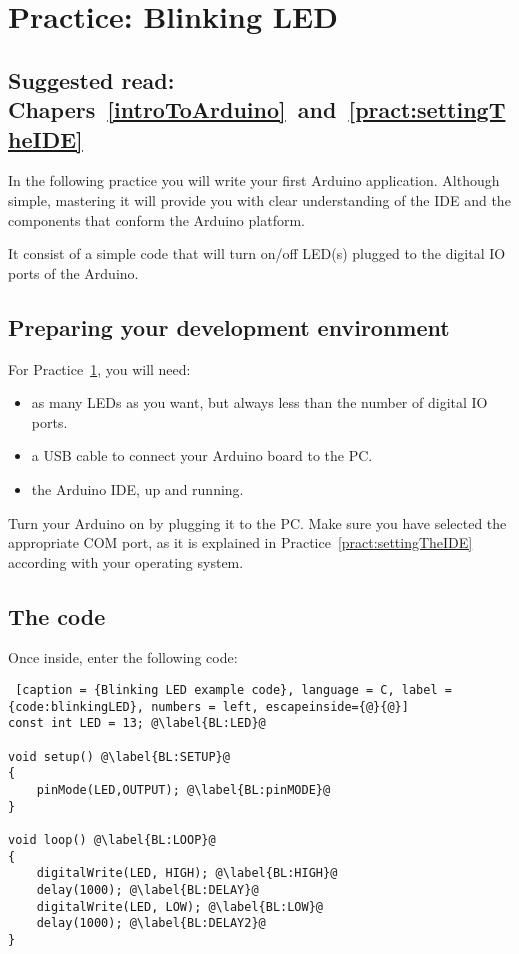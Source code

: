 \chapter{Practice: Blinking LED}\label{pract:blinkingLED}
\section*{Suggested read: Chapers~\ref{introToArduino}~and~\ref{pract:settingTheIDE}}

In the following practice you will write your first Arduino application. Although simple, mastering it will provide you with clear understanding of the IDE and the components that conform the Arduino platform.

It consist of a simple code that will turn on/off LED(s) plugged to the digital IO ports of the Arduino.

\section{Preparing your development environment}
For Practice~\ref{pract:blinkingLED}, you will need:
\begin{itemize}
 \item as many LEDs as you want, but always less than the number of digital IO ports.
 \item a USB cable to connect your Arduino board to the PC.
 \item the Arduino IDE, up and running.
\end{itemize}

Turn your Arduino on by plugging it to the PC. Make sure you have selected the appropriate COM port, as it is explained in Practice~\ref{pract:settingTheIDE} according with your operating system.

\section{The code} 
Once inside, enter the following code:

\begin{lstlisting} [caption = {Blinking LED example code}, language = C, label = {code:blinkingLED}, numbers = left, escapeinside={@}{@}]
const int LED = 13; @\label{BL:LED}@

void setup() @\label{BL:SETUP}@
{
	pinMode(LED,OUTPUT); @\label{BL:pinMODE}@
}

void loop() @\label{BL:LOOP}@
{
	digitalWrite(LED, HIGH); @\label{BL:HIGH}@
	delay(1000); @\label{BL:DELAY}@
	digitalWrite(LED, LOW); @\label{BL:LOW}@
	delay(1000); @\label{BL:DELAY2}@
}
\end{lstlisting}


